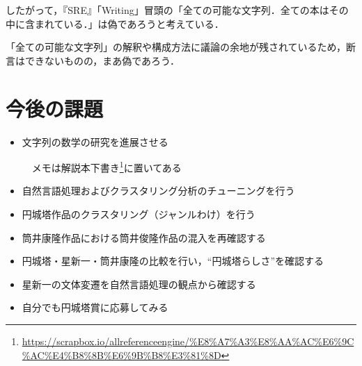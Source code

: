 \documentclass[10pt, a5paper, twoside]{jsarticle}
\theoremstyle{definition}
\begin{document}
		したがって，『SRE』「Writing」冒頭の「全ての可能な文字列．全ての本はその中に含まれている．」は偽であろうと考えている．

		「全ての可能な文字列」の解釈や構成方法に議論の余地が残されているため，断言はできないものの，まあ偽であろう．

	\section{今後の課題}

		\begin{itemize}

			\item 文字列の数学の研究を進展させる

			\vspace{1mm}

			　メモは解説本下書き\footnote{\url{https://scrapbox.io/allreferenceengine/%E8%A7%A3%E8%AA%AC%E6%9C%AC%E4%B8%8B%E6%9B%B8%E3%81%8D}}に置いてある

			\vspace{2mm}

			\item 自然言語処理およびクラスタリング分析のチューニングを行う

			\vspace{2mm}

			\item 円城塔作品のクラスタリング（ジャンルわけ）を行う

			\vspace{2mm}

			\item 筒井康隆作品における筒井俊隆作品の混入を再確認する

			\vspace{2mm}

			\item 円城塔・星新一・筒井康隆の比較を行い，“円城塔らしさ”を確認する

			\vspace{2mm}

			\item 星新一の文体変遷を自然言語処理の観点から確認する

			\vspace{2mm}

			\item 自分でも円城塔賞に応募してみる

		\end{itemize}
\end{document}
